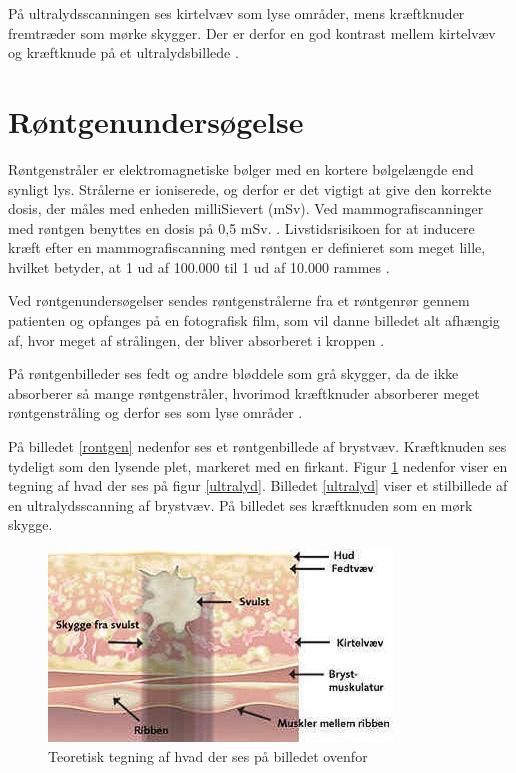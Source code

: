 På ultralydsscanningen ses kirtelvæv som lyse områder, mens kræftknuder fremtræder som mørke skygger. Der er derfor en god kontrast mellem kirtelvæv og kræftknude på et ultralydsbillede \cite{Ultralyd}.

\section{Røntgenundersøgelse}
Røntgenstråler er elektromagnetiske bølger med en kortere bølgelængde end synligt lys. Strålerne er ioniserede, og derfor er det vigtigt at give den korrekte dosis, der måles med enheden milliSievert (mSv). Ved mammografiscanninger med røntgen benyttes en dosis på 0,5 mSv. \cite{Sundhedsstyrelsen}. Livstidsrisikoen for at inducere kræft efter en mammografiscanning med røntgen er definieret som meget lille, hvilket betyder, at 1 ud af 100.000 til 1 ud af 10.000 rammes \cite{Risk}. 

Ved røntgenundersøgelser sendes røntgenstrålerne fra et røntgenrør gennem patienten og opfanges på en fotografisk film, som vil danne billedet alt afhængig af, hvor meget af strålingen, der bliver absorberet i kroppen \cite{Rontgenundersogelse}.

På røntgenbilleder ses fedt og andre bløddele som grå skygger, da de ikke absorberer så mange røntgenstråler, hvorimod kræftknuder absorberer meget røntgenstråling og derfor ses som lyse områder \cite{Rontgenundersogelse}.

På billedet \ref{rontgen} nedenfor ses et røntgenbillede af brystvæv. Kræftknuden ses tydeligt som den lysende plet, markeret med en firkant. Figur \ref{teo} nedenfor viser en tegning af hvad der ses på figur \ref{ultralyd}. Billedet \ref{ultralyd} viser et stilbillede af en ultralydsscanning af brystvæv. På billedet ses kræftknuden som en mørk skygge. 

\begin{figure}[H]
  \centering
    \includegraphics[width=\textwidth]{figurer/r/teori}
    \caption{Teoretisk tegning af hvad der ses på billedet ovenfor \cite{Ultralyd}}
    \label{teo}
\end{figure}

